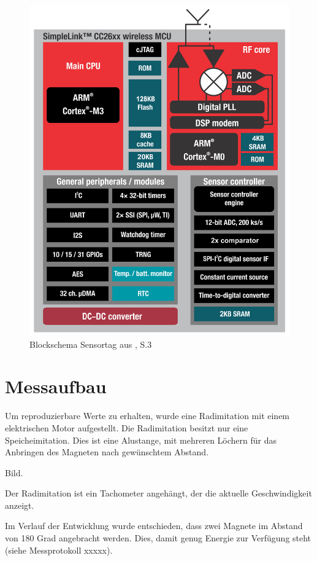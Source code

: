 \begin{figure}[h]
    \includegraphics {7Anhang/imag/CC26xx_Block_Diagram.png} 
     \caption{Blockschema Sensortag aus \cite{Sensortag_Datasheet}, S.3}
\end{figure}



\chapter{Messaufbau}
\label{messaufbau}

Um reproduzierbare Werte zu erhalten, wurde eine Radimitation mit einem elektrischen Motor aufgestellt. Die Radimitation besitzt nur eine Speicheimitation. Dies ist eine Alustange, mit mehreren Löchern für das Anbringen des Magneten nach gewünschtem Abstand.

Bild.

Der Radimitation ist ein Tachometer angehängt, der die aktuelle Geschwindigkeit anzeigt. 

Im Verlauf der Entwicklung wurde entschieden, dass zwei Magnete im Abstand von 180 Grad angebracht werden. Dies, damit genug Energie zur Verfügung steht (siehe Messprotokoll xxxxx). 

